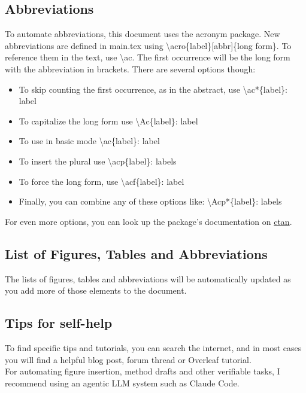 \subsection{Abbreviations}
To automate abbreviations, this document uses the acronym package.
New abbreviations are defined in main.tex using \textbackslash acro\{label\}[abbr]\{long form\}. To reference them in the text, use \textbackslash ac. The first occurrence will be the long form with the abbreviation in brackets. There are several options though:
\begin{itemize}
    \item To skip counting the first occurrence, as in the abstract, use \textbackslash ac*\{label\}: \ac*{label}
    \item To capitalize the long form use \textbackslash Ac\{label\}: \Ac*{label}
    \item To use in basic mode \textbackslash ac\{label\}: \ac{label}
    \item To insert the plural use \textbackslash acp\{label\}: \acp{label}
    \item To force the long form, use \textbackslash acf\{label\}: \acf{label}
    \item Finally, you can combine any of these options like: \textbackslash Acp*\{label\}: \Acfp*{label}
\end{itemize}
For even more options, you can look up the package's documentation on \href{https://www.ctan.org/pkg/acronym}{ctan}.

\subsection{List of Figures, Tables and Abbreviations}
The lists of figures, tables and abbreviations will be automatically updated as you add more of those elements to the document.

\subsection{Tips for self-help}
To find specific tips and tutorials, you can search the internet, and in most cases you will find a helpful blog post, forum thread or Overleaf tutorial.\\
For automating figure insertion, method drafts and other verifiable tasks, I recommend using an agentic LLM system such as Claude Code.

